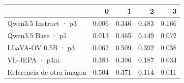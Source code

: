 \begin{tabular}{lrrrr}
\toprule
 & 0 & 1 & 2 & 3 \\
\midrule
Qwen3.5 Instruct · p3 & 0.006 & 0.346 & 0.483 & 0.166 \\
Qwen3.5 Base · p1 & 0.013 & 0.465 & 0.449 & 0.072 \\
LLaVA-OV 0.5B · p3 & 0.062 & 0.509 & 0.392 & 0.038 \\
VL-JEPA · p4m & 0.383 & 0.396 & 0.187 & 0.034 \\
Referencia de otra imagen & 0.504 & 0.371 & 0.114 & 0.011 \\
\bottomrule
\end{tabular}
